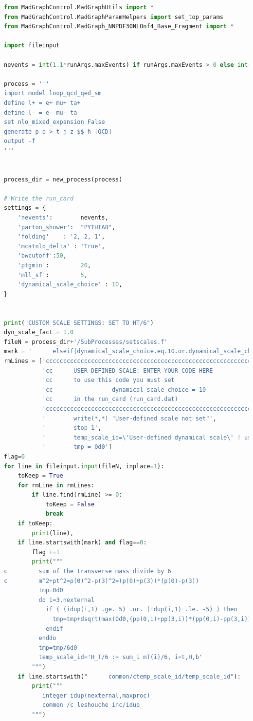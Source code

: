 \documentclass[NOTE, REPORT=true, atlasdraft=true, USenglish]{atlasdoc}
\begin{document}
\begin{lstlisting}[language=python, caption=$tqZ$ job option python script]
from MadGraphControl.MadGraphUtils import *
from MadGraphControl.MadGraphParamHelpers import set_top_params
from MadGraphControl.MadGraph_NNPDF30NLOnf4_Base_Fragment import *

import fileinput

nevents = int(1.1*runArgs.maxEvents) if runArgs.maxEvents > 0 else int(1.1*evgenConfig.nEventsPerJob)

process = '''
import model loop_qcd_qed_sm
define l+ = e+ mu+ ta+
define l- = e- mu- ta-
set nlo_mixed_expansion False
generate p p > t j z $$ h [QCD] 
output -f
'''


process_dir = new_process(process)

# Write the run_card
settings = {
    'nevents':        nevents,
    'parton_shower':  "PYTHIA8",
    'folding'    : '2, 2, 1',
    'mcatnlo_delta' : 'True',
    'bwcutoff':50,
    'ptgmin':         20,
    'mll_sf':         5,
    'dynamical_scale_choice' : 10,
}


print("CUSTOM SCALE SETTINGS: SET TO HT/6")
dyn_scale_fact = 1.0
fileN = process_dir+'/SubProcesses/setscales.f'
mark = '      elseif(dynamical_scale_choice.eq.10.or.dynamical_scale_choice.eq.0) then'
rmLines = ['ccccccccccccccccccccccccccccccccccccccccccccccccccccccccccccccccccccccccccccccccccc',
           'cc      USER-DEFINED SCALE: ENTER YOUR CODE HERE                                 cc',
           'cc      to use this code you must set                                            cc',
           'cc                 dynamical_scale_choice = 10                                   cc',
           'cc      in the run_card (run_card.dat)                                           cc',
           'ccccccccccccccccccccccccccccccccccccccccccccccccccccccccccccccccccccccccccccccccccc',
           '        write(*,*) "User-defined scale not set"',
           '        stop 1',
           '        temp_scale_id=\'User-defined dynamical scale\' ! use a meaningful string',
           '        tmp = 0d0']
flag=0
for line in fileinput.input(fileN, inplace=1):
    toKeep = True
    for rmLine in rmLines:
        if line.find(rmLine) >= 0:
            toKeep = False
            break
    if toKeep:
        print(line),
    if line.startswith(mark) and flag==0:
        flag +=1
        print("""
c         sum of the transverse mass divide by 6
c         m^2+pt^2=p(0)^2-p(3)^2=(p(0)+p(3))*(p(0)-p(3))
          tmp=0d0
          do i=3,nexternal
            if ( (idup(i,1) .ge. 5) .or. (idup(i,1) .le. -5) ) then
              tmp=tmp+dsqrt(max(0d0,(pp(0,i)+pp(3,i))*(pp(0,i)-pp(3,i))))
            endif
          enddo
          tmp=tmp/6d0
          temp_scale_id='H_T/6 := sum_i mT(i)/6, i=t,H,b'
        """)
    if line.startswith("      common/ctemp_scale_id/temp_scale_id"):
        print("""
           integer idup(nexternal,maxproc)
           common /c_leshouche_inc/idup
        """)



\end{lstlisting}
\end{document}
